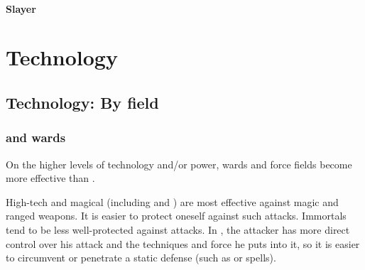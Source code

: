 \subsubsection{Slayer}







































\chapter{Technology}















\section{Technology: By field}









\subsection{\Armour and wards}
On the higher levels of technology and/or power, wards and force fields become more effective than \armour. 

High-tech and magical \armour (including  and ) are most effective against magic and ranged weapons. 
It is easier to protect oneself against such attacks. 
Immortals tend to be less well-protected against \melee{} attacks.
In \melee, the attacker has more direct control over his attack and the techniques and force he puts into it, so it is easier to circumvent or penetrate a static defense (such as \armour or spells). 

